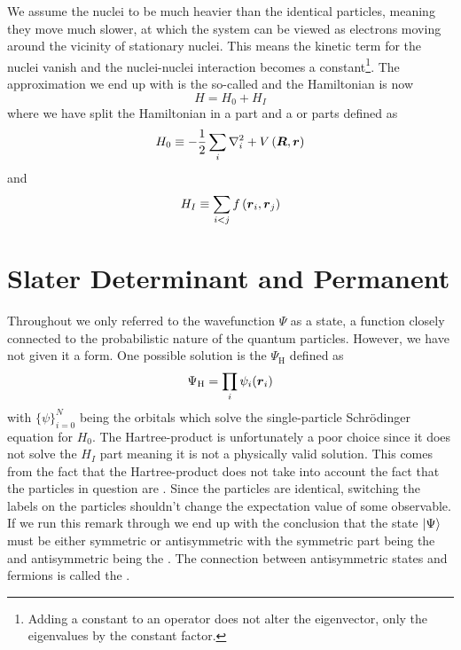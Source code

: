     We assume the nuclei to be much heavier than the identical particles,
    meaning they move much slower, at which the system can be viewed as
    electrons moving around the vicinity of stationary nuclei.  This means the
    kinetic term for the nuclei vanish and the nuclei-nuclei interaction
    becomes a constant\footnote{Adding a constant to an operator does not alter
    the eigenvector, only the eigenvalues by the constant
    factor\cite{linalgDavid}.}. The approximation we end up with is the
    so-called  and the Hamiltonian is now
        \begin{equation}
            H = H_0 + H_I
        \end{equation}
    where we have split the Hamiltonian in a  part and a
     or  parts defined as
        \begin{equation}
            H_0 \equiv - \frac{1}{2} \sum\limits_i \nabla^2_i +
            V\left(\boldsymbol{{R}},\boldsymbol{{r}}\right)
        \end{equation}
    and
        \begin{equation}
            H_I \equiv \sum_{i<j} f\left(\boldsymbol{{r}}_i, \boldsymbol{{r}}_j\right)
        \end{equation}

\section{Slater Determinant and Permanent}
    Throughout  we only referred to the wavefunction $\Psi$ as a
    state, a function closely connected to the probabilistic nature of the
    quantum particles. However, we have not given it a form. One possible
    solution is the  $\Psi_{\text{H}}$ defined as
        \begin{equation}
            \Psi_{\text{H}} = \prod_i\psi_i(\boldsymbol{{r}}_i)
        \end{equation}
    with $\{\psi\}_{i=0}^N$ being the orbitals which solve the single-particle
    Schrödinger equation for $H_0$. The Hartree-product is unfortunately a poor
    choice since it does not solve the $H_I$ part meaning it is not a
    physically valid solution. This comes from the fact that the
    Hartree-product does not take into account the fact that the particles in
    question are . Since the particles are
    identical, switching the labels on the particles shouldn't change the
    expectation value of some observable. If we run this remark through we
    end up with the conclusion that the state $\ket{\Psi}$ must be either
    symmetric or antisymmetric with the symmetric part being the  and antisymmetric being the . The connection
    between antisymmetric states and fermions is called the .

